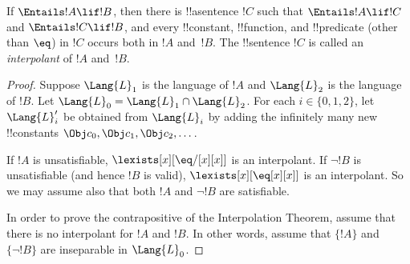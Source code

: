 \documentclass[../../../include/open-logic-section]{subfiles}
\begin{document}


\begin{thm}
If $\Entails !A \lif !B$, then there is !!a{sentence} $!C$ such that
$\Entails !A \lif !C$ and $\Entails !C \lif !B$, and every
!!{constant}, !!{function}, and !!{predicate} (other than $\eq$) in
$!C$ occurs both in $!A$ and~$!B$. The !!{sentence} $!C$ is called an
\emph{interpolant} of $!A$ and~$!B$.
\end{thm}

\begin{proof}
Suppose $\Lang{L}_1$ is the language of $!A$ and $\Lang{L}_2$ is the
language of $!B$. Let $\Lang{L}_0 = \Lang{L}_1 \cap \Lang{L}_2$. For
each $i \in \{0, 1, 2 \}$, let $\Lang{L}'_i$ be obtained from
$\Lang{L}_i$ by adding the infinitely many new !!{constant}s $\Obj c_0,
\Obj c_1, \Obj c_2, \dots$. 

If $!A$ is unsatisfiable, $\lexists[x][\eq/[x][x]]$ is an
interpolant. If $\lnot !B$ is unsatisfiable (and hence $!B$ is valid),
$\lexists[x][\eq[x][x]]$ is an interpolant. So we may assume also that
both $!A$ and $\lnot !B$ are satisfiable.

In order to prove the contrapositive of the Interpolation Theorem,
assume that there is no interpolant for $!A$ and $!B$. In other words,
assume that $\{!A\}$ and $\{\lnot !B\}$ are inseparable in
$\Lang{L}_0$.


\end{proof}
\end{document}
